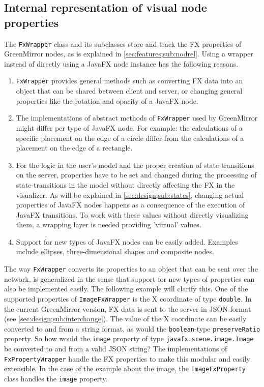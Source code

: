 \subsection{Internal representation of visual node properties}\label{sec:design;sub:fxwrapper}
The \lstinline{FxWrapper} class and its subclasses store and track the FX properties of GreenMirror nodes, as is explained in \cref{sec:features;sub:nodrel}. Using a wrapper instead of directly using a JavaFX node instance has the following reasons.
\begin{enumerate}
\item \lstinline{FxWrapper} provides general methods such as converting FX data into an object that can be shared between client and server, or changing general properties like the rotation and opacity of a JavaFX node.
\item The implementations of abstract methods of \lstinline{FxWrapper} used by GreenMirror might differ per type of JavaFX node. For example: the calculations of a specific placement on the edge of a circle differ from the calculations of a placement on the edge of a rectangle.
\item For the logic in the user's model and the proper creation of state-transitions on the server, properties have to be set and changed during the processing of state-transitions in the model without directly affecting the FX in the visualizer. As will be explained in \cref{sec:design;sub:states}, changing actual properties of JavaFX nodes happens as a consequence of the execution of JavaFX transitions. To work with these values without directly visualizing them, a wrapping layer is needed providing 'virtual' values. 
\item Support for new types of JavaFX nodes can be easily added. Examples include ellipses, three-dimensional shapes and composite nodes.
\end{enumerate}
The way \lstinline{FxWrapper} converts its properties to an object that can be sent over the network, is generalized in the sense that support for new types of properties can also be implemented easily. The following example will clarify this. One of the supported properties of \lstinline{ImageFxWrapper} is the X coordinate of type \lstinline{double}. In the current GreenMirror version, FX data is sent to the server in JSON format (see \cref{sec:design;sub:interchange}). The value of the X coordinate can be easily converted to and from a string format, as would the \lstinline{boolean}-type \lstinline{preserveRatio} property. So how would the \lstinline{image} property of type \lstinline{javafx.scene.image.Image} be converted to and from a valid JSON string? The implementations of \lstinline{FxPropertyWrapper} handle the FX properties to make this modular and easily extensible. In the case of the example about the image, the \lstinline{ImageFxProperty} class handles the \lstinline{image} property.

